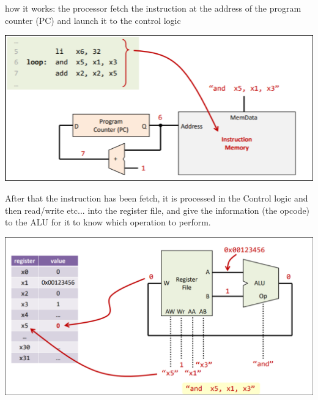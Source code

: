 how it works: the processor fetch the instruction at the address of the program counter (PC) and launch it to the control logic
\begin{center}
\includegraphics[scale=0.6]{screenshots/2025-10-11_2.png}
\end{center}
After that the instruction has been fetch, it is processed in the Control logic and then read/write etc... into the register file, and give the information (the opcode) to the ALU for it to know which operation to perform.
\begin{center}
\includegraphics[scale=0.2]{screenshots/2025-10-11_3.png}
\end{center}
